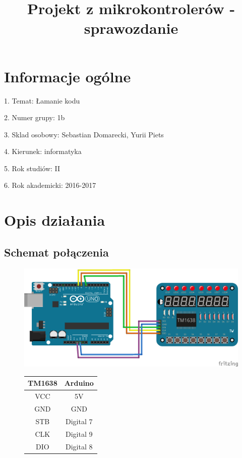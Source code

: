 \documentclass[a4paper,12pt]{article}
\title{Projekt z mikrokontrolerów - sprawozdanie}
\begin{document}
\maketitle

\section{Informacje ogólne}
\par 1. Temat: Łamanie kodu 
\par 2. Numer grupy: 1b
\par 3. Sklad osobowy: Sebastian Domarecki, Yurii Piets
\par 4. Kierunek: informatyka
\par 5. Rok studiów: II
\par 6. Rok akademicki: 2016-2017

\section{Opis działania}
\subsection{Schemat połączenia}

\begin{figure}[!ht]
	
	\centering
	\includegraphics[scale=0.5]{Mikro_bb.png}
	\qquad
	\begin{tabular}[b]{cc}\hline
		TM1638 & Arduino \\ \hline
		VCC & 5V \\
		GND & GND \\
		STB & Digital 7 \\
		CLK & Digital 9 \\
		DIO & Digital 8 \\ \hline
	\end{tabular}
	\label{fig:schemat}
\end{figure}
\end{document}

